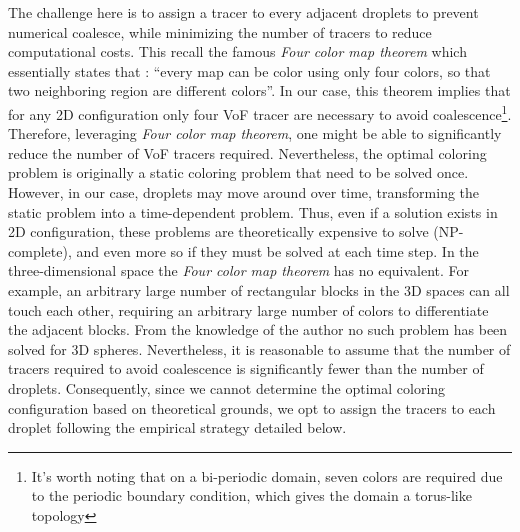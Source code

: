 The challenge here is to assign a tracer to every adjacent droplets to prevent numerical coalesce, while minimizing the number of tracers to reduce computational costs. 
This recall the famous \textit{Four color map theorem} \citep{appel1977solution} which essentially states that : 
\enquote{every map can be color using only four colors, so that two neighboring region are different colors}. 
In our case, this theorem implies that for any 2D configuration only four VoF tracer are necessary to avoid coalescence\footnote{It's worth noting that on a bi-periodic domain, seven colors are required due to the periodic boundary condition, which gives the domain a torus-like topology  }. 
Therefore, leveraging \textit{Four color map theorem}, one might be able to significantly reduce the number of VoF tracers required.
Nevertheless, the optimal coloring problem is originally a static coloring problem that need to be solved once. 
However, in our case, droplets may move around over time, transforming the static problem into a time-dependent problem. 
Thus, even if a solution exists in 2D configuration, these problems are theoretically expensive to solve (NP-complete), and even more so if they must be solved at each time step.  
In the three-dimensional space the \textit{Four color map theorem} has no equivalent. 
For example, an arbitrary large number of rectangular blocks in the 3D spaces can all touch each other, requiring an arbitrary large number of colors to differentiate the adjacent blocks\citep{magnant2011coloring}. 
From the knowledge of the author no such problem has been solved for 3D spheres. 
Nevertheless, it is reasonable to assume that the number of tracers required to avoid coalescence is significantly fewer than the number of droplets.
Consequently, since we cannot determine the optimal coloring configuration based on theoretical grounds, we opt to assign the tracers to each droplet following the empirical strategy detailed below.

